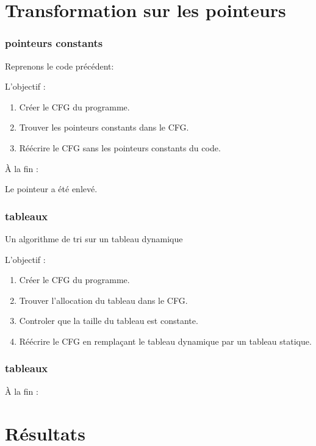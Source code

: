 \section{Transformation sur les pointeurs}%

\begin{frame}\frametitle{pointeurs constants}
  Reprenons le code précédent:
  
  L'objectif  :
  \begin{enumerate}
  \item Créer le CFG du programme.
  \item Trouver les pointeurs constants dans le CFG.
  \item Réécrire le CFG sans les pointeurs constants du code.
  \end{enumerate}
\end{frame}

\begin{frame}
  \`A la fin :
  
  Le pointeur a été enlevé.
\end{frame}

\begin{frame}\frametitle{tableaux}
  Un algorithme de tri sur un tableau dynamique
  
\end{frame}
   
\begin{frame}
  L'objectif :
  \begin{enumerate}
  \item Créer le CFG du programme.
  \item Trouver l'allocation du tableau dans le CFG.
  \item Controler que la taille du tableau est constante.
  \item Réécrire le CFG en remplaçant le tableau dynamique par un tableau statique.
  \end{enumerate}
\end{frame}

\begin{frame}\frametitle{tableaux}
  \`A la fin :
  
\end{frame}

\section{Résultats}%

